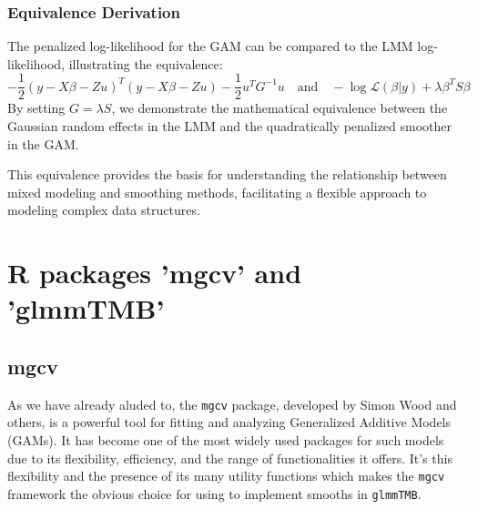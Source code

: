\documentclass[12pt, twoside,hidelinks]{article}
\theoremstyle{definition}
\numberwithin{equation}{section}
\begin{document}
\subsubsection{Equivalence Derivation}
The penalized log-likelihood for the GAM can be compared to the LMM log-likelihood, illustrating the equivalence:
\begin{equation}
-\frac{1}{2} (y - X\beta - Zu)^T (y - X\beta - Zu) - \frac{1}{2} u^T G^{-1} u \quad \text{and} \quad -\log \mathcal{L}(\beta | y) + \lambda \beta^T S \beta
\label{eq:equivalence_derivation}
\end{equation}
By setting \( G = \lambda S \), we demonstrate the mathematical equivalence between the Gaussian random effects in the LMM and the quadratically penalized smoother in the GAM.

This equivalence provides the basis for understanding the relationship between mixed modeling and smoothing methods, facilitating a flexible approach to modeling complex data structures.



\section{R packages 'mgcv' and 'glmmTMB'}

\subsection{mgcv}

As we have already aluded to, the \texttt{mgcv} package, developed by Simon Wood and others, is a powerful tool for fitting and analyzing Generalized Additive Models (GAMs). It has become one of the most widely used packages for such models due to its flexibility, efficiency, and the range of functionalities it offers. It's this flexibility and the presence of its many utility functions which makes the \texttt{mgcv} framework the obvious choice for using to implement smooths in \texttt{glmmTMB}.
\end{document}
